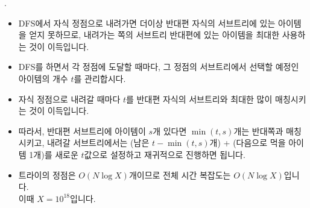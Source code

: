 \begin{frame}{\probno{}. \probtitle{}}
    \begin{itemize}
        \item DFS에서 자식 정점으로 내려가면 더이상 반대편 자식의 서브트리에 있는 아이템을 얻지 못하므로, 내려가는 쪽의 서브트리 반대편에 있는 아이템을 최대한 사용하는 것이 이득입니다.
        \item DFS를 하면서 각 정점에 도달할 때마다, 그 정점의 서브트리에서 선택할 예정인 아이템의 개수 $t$를 관리합시다.
        \item 자식 정점으로 내려갈 때마다 $t$를 반대편 자식의 서브트리와 최대한 많이 매칭시키는 것이 이득입니다.
        \item 따라서, 반대편 서브트리에 아이템이 $s$개 있다면 $\min(t, s)$개는 반대쪽과 매칭시키고, 내려갈 서브트리에서는 (남은 $t-\min(t,s)$개) + (다음으로 먹을 아이템 1개)를 새로운 $t$값으로 설정하고 재귀적으로 진행하면 됩니다.
        \item 트라이의 정점은 $O(N \log X)$개이므로 전체 시간 복잡도는 $O(N \log X)$입니다.\\이때 $X=10^{18}$입니다.
    \end{itemize}
\end{frame}
